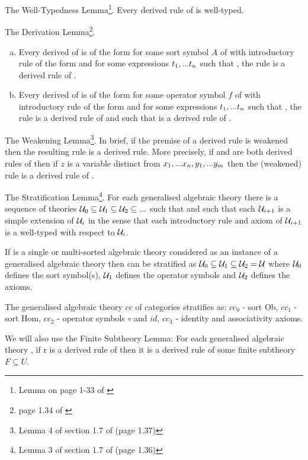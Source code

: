 \note The Well-Typedness Lemma\footnote{Lemma on page 1-33 of \cite{Cartmell78}}. Every derived rule of \gatUw is well-typed. 

\note The Derivation Lemma\footnote{page 1.34 of \cite{Cartmell78}}. 
\begin{enumerate}[(a)]

\item Every derived \Trule of \gatUw is of the form
 for some sort symbol $A$ of \gatUw with introductory rule of the form
 and for some expressions $t_1,...t_n$ such that \foreachi, the rule
 is a derived rule of \gatU.

\item Every derived \trule of \gatUw is of the form
 for some operator symbol $f$ of \gatUw 
with introductory rule of the form
and for some expressions $t_1,...t_n$ such that \foreachi, the rule
 is a derived rule of \gatUw
and such that
 is a derived rule of \gatU.
\end{enumerate}

\note The Weakening Lemma\footnote{Lemma 4 of section 1.7 of \cite{Cartmell78} (page 1.37)}. In brief, if the premise of a derived rule is weakened then the resulting rule is a derived rule. More precisely, if 
  and
 are both derived rules of \gatUw then if $z$ is a variable
distinct from $x_1,...x_n,y_1,...y_m$ then
the (weakened) rule  is a derived rule
of \gatU.

\note The Stratification Lemma\footnote{Lemma 3 of section 1.7 of \cite{Cartmell78} (page 1.36)}. For each generalised algebraic theory \gatUw  there is a sequence of theories 
$\mathcal{U}_0 \subseteq \mathcal{U}_1 \subseteq \mathcal{U}_2 \subseteq ...$ such that  
and such that each $\mathcal{U}_{i+1}$ is a simple extension of $\mathcal{U}_i$ in the sense that each introductory rule and axiom of $\mathcal{U}_{i+1}$ is a well-typed  with respect to $\mathcal{U}_i$.

\note
If \gatUw is a single or multi-sorted algebraic theory considered as an instance of a
 generalised algebraic theory then \gatUw can be stratified as $\mathcal{U}_0 \subseteq \mathcal{U}_1 \subseteq \mathcal{U}_2=\mathcal{U}$
where $\mathcal{U}_0$ defines the sort symbol(s), $\mathcal{U}_1$ defines the operator symbols and $\mathcal{U}_2$ defines the axioms. 

\note The generalised algebraic theory $cc$ of categories stratifies as: $cc_0$ - sort Ob,
$cc_1$ - sort Hom, $cc_2$ - operator symbols $\circ$ and $id$, $cc_3$ - identity and associativity axioms.
 

\note We will also use the Finite Subtheory Lemma: For each generalised algebraic theory \gatU, if r is a derived rule of \gatUw then it is a derived rule of some finite subtheory $F \subseteq U$. 




